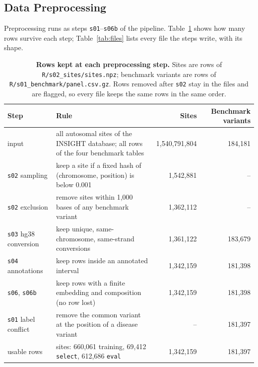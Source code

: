 \documentclass[11pt]{article}
\newcommand{\file}[1]{\nolinkurl{#1}}
\begin{document}
\subsection*{Data Preprocessing}

Preprocessing runs as steps \file{s01}--\file{s06b} of the pipeline. Table~\ref{tab:funnel} shows how many
rows survive each step; Table~\ref{tab:files} lists every file the steps write, with its shape.

\begin{table}[t]
\centering\footnotesize
\caption{\textbf{Rows kept at each preprocessing step.} Sites are rows of \file{R/s02_sites/sites.npz};
benchmark variants are rows of \file{R/s01_benchmark/panel.csv.gz}. Rows removed after \file{s02} stay in
the files and are flagged, so every file keeps the same rows in the same order.}
\label{tab:funnel}
\begin{tabularx}{\textwidth}{@{}l >{\raggedright\arraybackslash}X r r@{}}
\toprule
Step & Rule & Sites & Benchmark variants \\
\midrule
input & all autosomal sites of the INSIGHT database; all rows of the four benchmark tables & 1,540,791,804 & 184,181 \\
\file{s02} sampling & keep a site if a fixed hash of (chromosome, position) is below 0.001 & 1,542,881 & -- \\
\file{s02} exclusion & remove sites within 1,000 bases of any benchmark variant & 1,362,112 & -- \\
\file{s03} hg38 conversion & keep unique, same-chromosome, same-strand conversions & 1,361,122 & 183,679 \\
\file{s04} annotations & keep rows inside an annotated interval & 1,342,159 & 181,398 \\
\file{s06}, \file{s06b} & keep rows with a finite embedding and composition (no row lost) & 1,342,159 & 181,398 \\
\file{s01} label conflict & remove the common variant at the position of a disease variant & -- & 181,397 \\
\midrule
usable rows & sites: 660,061 training, 69,412 \texttt{select}, 612,686 \texttt{eval} & 1,342,159 & 181,397 \\
\bottomrule
\end{tabularx}
\end{table}
\end{document}
